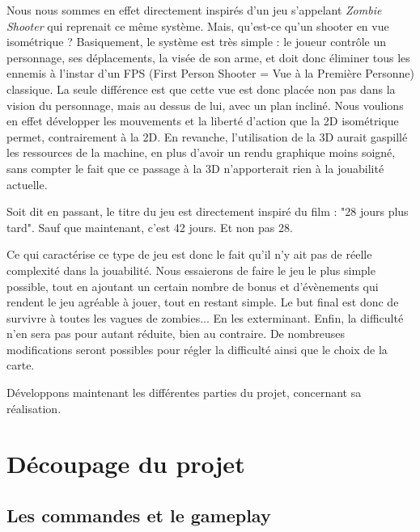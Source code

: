 \documentclass{article}
\begin{document}
\par
Nous nous sommes en effet directement inspirés d'un jeu s'appelant \emph{Zombie Shooter} qui reprenait ce même système. Mais, qu'est-ce qu'un shooter en vue isométrique ? Basiquement, le système est très simple : le joueur contrôle un personnage, ses déplacements, la visée de son arme, et doit donc éliminer tous les ennemis à l'instar d'un FPS (First Person Shooter = Vue à la Première Personne) classique. La seule différence est que cette vue est donc placée non pas dans la vision du personnage, mais au dessus de lui, avec un plan incliné. Nous voulions en effet développer les mouvements et la liberté d'action que la 2D isométrique permet, contrairement à la 2D. En revanche, l'utilisation de la 3D aurait gaspillé les ressources de la machine, en plus d'avoir un rendu graphique moins soigné, sans compter le fait que ce passage à la 3D n'apporterait rien à la jouabilité actuelle.
\newline

\par
Soit dit en passant, le titre du jeu est directement inspiré du film : "28 jours plus tard". Sauf que maintenant, c'est 42 jours. Et non pas 28.
\newline

\par
Ce qui caractérise ce type de jeu est donc le fait qu'il n'y ait pas de réelle complexité dans la jouabilité. Nous essaierons de faire le jeu le plus simple possible, tout en ajoutant un certain nombre de bonus et d'évènements qui rendent le jeu agréable à jouer, tout en restant simple. Le but final est donc de survivre à toutes les vagues de zombies... En les exterminant. Enfin, la difficulté n'en sera pas pour autant réduite, bien au contraire. De nombreuses modifications seront possibles pour régler la difficulté ainsi que le choix de la carte.
\newline

\par
Développons maintenant les différentes parties du projet, concernant sa réalisation.
\newline



\newpage
\section{Découpage du projet}
\subsection{Les commandes et le gameplay}
\end{document}
